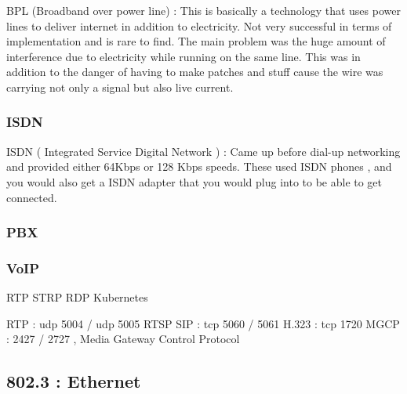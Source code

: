 BPL (Broadband over power line) : This is basically a technology that uses power
lines to deliver internet in addition to electricity. Not very successful in
terms of implementation and is rare to find. The main problem was the huge
amount of interference due to electricity while running on the same line. This
was in addition to the danger of having to make patches and stuff cause the wire
was carrying not only a signal but also live current.

\subsubsectionend

\subsubsection{ISDN}
\label{sssec:isdn}


ISDN ( Integrated Service Digital Network ) : Came up before dial-up networking
and provided either 64Kbps or 128 Kbps speeds. These used ISDN phones , and you
would also get a ISDN adapter that you would plug into to be able to get
connected.

\subsubsectionend

\subsubsection{PBX}
\label{sssec:pbx}



\subsubsectionend

\subsubsection{VoIP}
\label{sssec:voip}

RTP
STRP
RDP
Kubernetes

RTP : udp 5004 / udp 5005
RTSP
SIP : tcp 5060 / 5061
H.323 : tcp 1720
MGCP : 2427 / 2727 , Media Gateway Control Protocol


\subsubsectionend


\subsectionend

\subsection{802.3 : Ethernet}
\label{ssec:802_3_ethernet}

